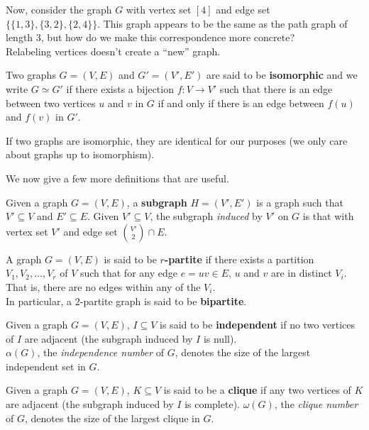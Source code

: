 \documentclass{article}
\begin{document}
		Now, consider the graph $G$ with vertex set $[4]$ and edge set $\{\{1,3\},\{3,2\},\{2,4\}\}$. This graph appears to be the same as the path graph of length $3$, but how do we make this correspondence more concrete?\\
		Relabeling vertices doesn't create a ``new'' graph.

		\begin{fdef}
			Two graphs $G = (V,E)$ and $G' = (V',E')$ are said to be \textbf{isomorphic} and we write $G \simeq G'$ if there exists a bijection $f : V \to V'$ such that there is an edge between two vertices $u$ and $v$ in $G$ if and only if there is an edge between $f(u)$ and $f(v)$ in $G'$.
		\end{fdef}

		If two graphs are isomorphic, they are identical for our purposes (we only care about graphs up to isomorphism).

		We now give a few more definitions that are useful.

		\begin{fdef}[Subgraph]
			Given a graph $G = (V,E)$, a \textbf{subgraph} $H = (V',E')$ is a graph such that $V' \subseteq V$ and $E' \subseteq E$. Given $V' \subseteq V$, the subgraph \emph{induced} by $V'$ on $G$ is that with vertex set $V'$ and edge set $\binom{V'}{2} \cap E$.
		\end{fdef}

		\begin{fdef}
			A graph $G = (V,E)$ is said to be \textbf{$r$-partite} if there exists a partition $V_1, V_2, \ldots, V_r$ of $V$ such that for any edge $e = uv \in E$, $u$ and $v$ are in distinct $V_i$. That is, there are no edges within any of the $V_i$.\\
			In particular, a $2$-partite graph is said to be \textbf{bipartite}.
		\end{fdef}

		\begin{fdef}
			Given a graph $G=(V,E)$, $I \subseteq V$ is said to be \textbf{independent} if no two vertices of $I$ are adjacent (the subgraph induced by $I$ is null).\\
			$\alpha(G)$, the \emph{independence number} of $G$, denotes the size of the largest independent set in $G$.
		\end{fdef}

		\begin{fdef}[Clique]
			Given a graph $G=(V,E)$, $K \subseteq V$ is said to be a \textbf{clique} if any two vertices of $K$ are adjacent (the subgraph induced by $I$ is complete).
			$\omega(G)$, the \emph{clique number} of $G$, denotes the size of the largest clique in $G$.
		\end{fdef}
\end{document}

